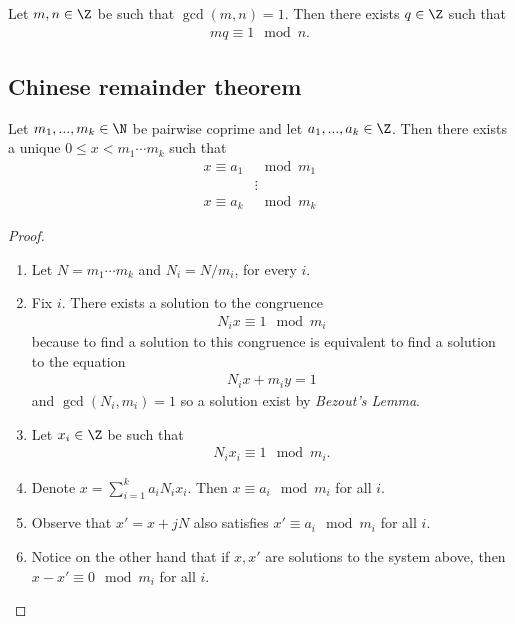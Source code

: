 \documentclass{article}
\begin{document}
\begin{lemma}[Lecture 5]
	Let $m,n\in\Z$ be such that $\gcd(m,n)=1$. Then there exists $q\in\Z$ such that
	\begin{align*}
		mq\equiv 1\mod n.
	\end{align*}
\end{lemma}

\subsection{Chinese remainder theorem}

\begin{theorem}
	Let $m_1,...,m_k\in\N$ be pairwise coprime and let $a_1,...,a_k\in\Z$. Then there exists a
	unique $0\leq x<m_1\cdots m_k$ such that
	\begin{align*}
		x\equiv a_1 & \mod m_1 \\
		            & \vdots   \\
		x\equiv a_k & \mod m_k
	\end{align*}
	\begin{proof}
		\begin{enumerate}
			\item Let $N=m_1\cdots m_k$ and $N_i=N/m_i$, for every $i$.
			\item Fix $i$. There exists a solution to the congruence \begin{align*}
				      N_ix\equiv 1 \mod m_i
			      \end{align*}
			      because to find a solution to this congruence is equivalent to find a solution to
			      the equation
			      \begin{align*}
				      N_ix +m_iy=1
			      \end{align*}
			      and $\gcd(N_i,m_i)=1$ so a solution exist by \emph{Bezout's Lemma}.
			\item Let $x_i\in\Z$ be such that \begin{align*}
				      N_ix_i\equiv 1 \mod m_i.
			      \end{align*}
			\item Denote $x=\sum_{i=1}^k a_iN_ix_i$. Then $x\equiv a_i \mod m_i$ for all $i$.
			\item Observe that $x'=x+jN$ also satisfies $x'\equiv a_i \mod m_i$ for all $i$.
			\item Notice on the other hand that if $x,x'$ are solutions to the system above, then
			      $x-x'\equiv 0 \mod m_i$ for all $i$.
		\end{enumerate}
	\end{proof}
\end{theorem}
\end{document}

